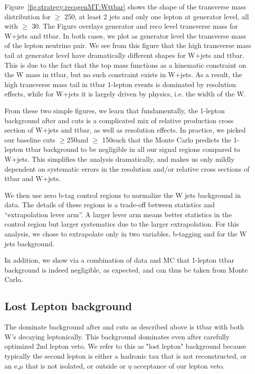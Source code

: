 Figure~\ref{fig:strategy:recogenMT:Wttbar} shows the shape of the transverse mass distribution for \MET $\ge$ 250\GeV, at least 2 jets and only one lepton 
at generator level, all with \pt $\ge$ 30\GeV. The Figure overlays generator and reco level transverse mass for W+jets and ttbar.
In both cases, we plot as generator level the transverse mass of the lepton neutrino pair. 
We see from this figure that the high transverse mass tail at generator level have dramatically different shapes for W+jets and ttbar. 
This is due to the fact that the top mass functions as a kinematic constraint on the W mass in ttbar, but no such constraint exists in W+jets.
As a result, the high transverse mass tail in ttbar 1-lepton events is dominated by \MET resolution effects, while for W+jets it is
largely driven by physics, i.e. the width of the W.

From these two simple figures, we learn that fundamentally, the 1-lepton background after \MT and \MET cuts is a complicated 
mix of relative production cross section of W+jets and ttbar, as well as \MET resolution effects. 
In practice, we picked our baseline cuts \MET$\ge$250\GeV and \MT$\ge$ 150\GeV such that 
the Monte Carlo predicts the 1-lepton ttbar background to be negligible in all our signal regions compared to W+jets.
This simplifies the analysis dramatically, and makes us only mildly dependent on systematic errors in the \MET resolution and/or
relative cross sections of ttbar and W+jets.

We then use zero b-tag control regions to normalize the W jets background in data. 
The details of these regions is a trade-off between statistics and ``extrapolation lever arm''.
A larger lever arm means better statistics in the control region but larger systematics due to the larger extrapolation.
For this analysis, we chose to extrapolate only in two variables, b-tagging and \MET for the W jets background.

In addition, we show via a combination of data and MC that 1-lepton ttbar background is indeed negligible, as expected,
and can thus be taken from Monte Carlo.

\subsection{Lost Lepton background}

The dominate background after \MET and \MT cuts as described above is ttbar with both W's decaying leptonically.
This background dominates even after carefully optimized 2nd lepton veto. We refer to this as "lost lepton" background
because typically the second lepton is either a hadronic tau that is not reconstructed, or an e,$\mu$ that is not isolated, or outside
\pt or $\eta$ acceptance of our lepton veto.

